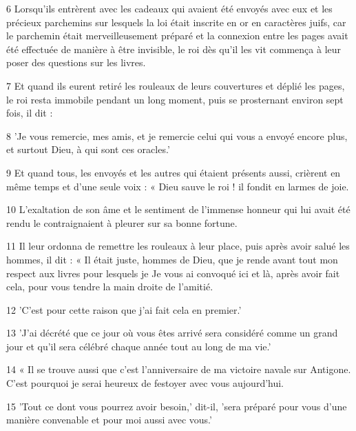 \par 6 Lorsqu'ils entrèrent avec les cadeaux qui avaient été envoyés avec eux et les précieux parchemins sur lesquels la loi était inscrite en or en caractères juifs, car le parchemin était merveilleusement préparé et la connexion entre les pages avait été effectuée de manière à être invisible, le roi dès qu'il les vit commença à leur poser des questions sur les livres.

\par 7 Et quand ils eurent retiré les rouleaux de leurs couvertures et déplié les pages, le roi resta immobile pendant un long moment, puis se prosternant environ sept fois, il dit :

\par 8 'Je vous remercie, mes amis, et je remercie celui qui vous a envoyé encore plus, et surtout Dieu, à qui sont ces oracles.'

\par 9 Et quand tous, les envoyés et les autres qui étaient présents aussi, crièrent en même temps et d'une seule voix : « Dieu sauve le roi ! il fondit en larmes de joie.

\par 10 L'exaltation de son âme et le sentiment de l'immense honneur qui lui avait été rendu le contraignaient à pleurer sur sa bonne fortune.

\par 11 Il leur ordonna de remettre les rouleaux à leur place, puis après avoir salué les hommes, il dit : « Il était juste, hommes de Dieu, que je rende avant tout mon respect aux livres pour lesquels je Je vous ai convoqué ici et là, après avoir fait cela, pour vous tendre la main droite de l'amitié.

\par 12 'C'est pour cette raison que j'ai fait cela en premier.'

\par 13 'J'ai décrété que ce jour où vous êtes arrivé sera considéré comme un grand jour et qu'il sera célébré chaque année tout au long de ma vie.'

\par 14 « Il se trouve aussi que c'est l'anniversaire de ma victoire navale sur Antigone. C'est pourquoi je serai heureux de festoyer avec vous aujourd'hui.

\par 15 'Tout ce dont vous pourrez avoir besoin,' dit-il, 'sera préparé pour vous d'une manière convenable et pour moi aussi avec vous.'

